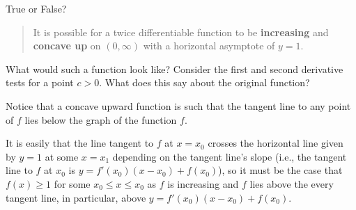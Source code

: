 \documentclass{ximera}
\author{Gregory Hartman \and Matthew Carr}
\begin{document}
\begin{exercise}




True or False? 
\begin{quote}
It is possible for a twice differentiable function to be \textbf{increasing} and \textbf{concave up} on $(0,\infty)$ with a horizontal asymptote of $y=1$.
\end{quote}

\begin{prompt}
\begin{multipleChoice}
\end{multipleChoice}
\end{prompt}

\begin{hint}
What would such a function look like? Consider the first and second derivative tests for a point $c>0$. What does this say about the original function?
\end{hint}
\begin{hint}
Notice that a concave upward function is such that the tangent line to any point of $f$ lies below the graph of the function $f$. 
\end{hint}
\begin{hint}
It is easily that the line tangent to $f$ at $x=x_0$ crosses the horizontal line given by $y=1$ at some $x=x_1$ depending on the tangent line's slope (i.e., the tangent line to $f$ at $x_0$ is $y=f'(x_0)(x-x_0)+f(x_0)$), so it must be the case that $f(x)\ge1$ for some $x_0\le x\le x_0$ as $f$ is increasing and $f$ lies above the every tangent line, in particular, above $y=f'(x_0)(x-x_0)+f(x_0)$.
\end{hint}
\end{exercise}
\end{document}
